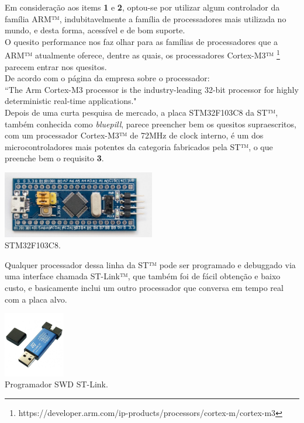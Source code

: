 \documentclass[10pt,a4paper]{report}
\begin{document}
	Em consideração aos items {\bf 1} e {\bf 2}, optou-se por utilizar algum controlador da família ARM™, indubitavelmente a família de processadores mais utilizada no mundo, e desta forma, acessível e de bom suporte. \\
	
	O quesito performance nos faz olhar para as famílias de processadores que a ARM™ atualmente oferece, dentre as quais, os processadores Cortex-M3™ \footnote{https://developer.arm.com/ip-products/processors/cortex-m/cortex-m3} parecem entrar nos quesitos. \\
	
	De acordo com o página da empresa sobre o processador:\\
	
	``The Arm Cortex-M3 processor is the industry-leading 32-bit processor for highly deterministic real-time applications."\\
	
	Depois de uma curta pesquisa de mercado, a placa STM32F103C8 da ST™, também conhecida como {\it bluepill}, parece preencher bem os quesitos supraescritos, com um processador Cortex-M3™ de 72MHz de clock interno, é um dos microcontroladores mais potentes da categoria fabricados pela ST™, o que preenche bem o requisito {\bf 3}.\\
	\begin{center}
		\includegraphics[width=0.5\textwidth]{bluepill}\\
		\footnotesize{STM32F103C8.}
	\end{center}

	
	Qualquer processador dessa linha da ST™ pode ser programado e debuggado via uma interface chamada ST-Link™, que também foi de fácil obtenção e baixo custo, e basicamente inclui um outro processador que conversa em tempo real com a placa alvo.
	\begin{center}
	\includegraphics[width=0.2\textwidth]{stlink}\\
	\footnotesize{Programador SWD ST-Link.}
	\end{center}
	
\end{document}
